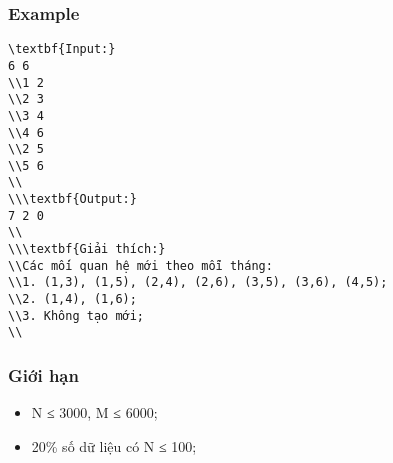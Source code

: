 \subsubsection{   Example  }
\begin{verbatim}
\textbf{Input:}
6 6
\\1 2
\\2 3
\\3 4
\\4 6
\\2 5
\\5 6
\\
\\\textbf{Output:}
7 2 0
\\
\\\textbf{Giải thích:}
\\Các mối quan hệ mới theo mỗi tháng:
\\1. (1,3), (1,5), (2,4), (2,6), (3,5), (3,6), (4,5);
\\2. (1,4), (1,6);
\\3. Không tạo mới;
\\\end{verbatim}

\subsubsection{   Giới hạn  }
\begin{itemize}
	\item     N ≤ 3000, M ≤ 6000;   
	\item     20\% số dữ liệu có N ≤ 100;   
\end{itemize}